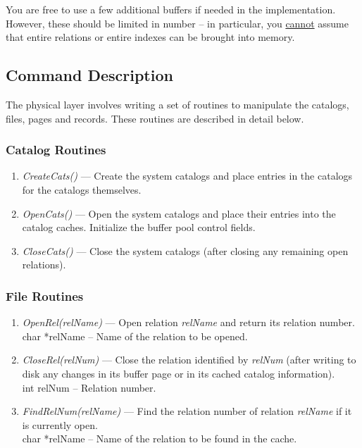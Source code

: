 You are free to use a few additional buffers if needed in the
implementation.  However, these should be limited in number -- in
particular, you \underline{cannot} assume that entire relations
or entire indexes can be brought into memory.

\subsection{Command Description}
The physical layer involves writing a set of routines to manipulate the
catalogs, files, pages and records.
These routines are described in detail below.

\subsubsection{Catalog Routines}
\begin{enumerate}
\item
\emph{CreateCats()} --- Create the system catalogs
and place entries in the catalogs for the catalogs themselves.
\item
\emph{OpenCats()} --- Open the system catalogs 
and place their entries into the catalog caches.
Initialize the buffer pool control fields.
\item
\emph{CloseCats()} --- Close the system catalogs (after closing
any remaining open relations).
\end{enumerate}

\subsubsection{File Routines}
\begin{enumerate}
\item
\emph{OpenRel(relName)} --- Open relation \emph{relName} and return its
relation number.
\\
char *relName -- Name of the relation to be opened.
\item
\emph{CloseRel(relNum)} --- Close the relation identified by \emph{relNum}
(after writing to disk any changes in its buffer page or in its cached
catalog information).
\\
int relNum -- Relation number.
\item
\emph{FindRelNum(relName)} --- Find the relation number of relation
\emph{relName} if it is currently open.
\\
char *relName -- Name of the relation to be found in the cache.
\end{enumerate}

